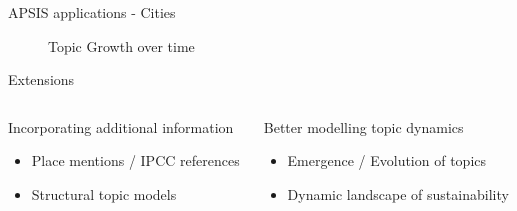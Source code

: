 \documentclass[9pt]{beamer}
\begin{document}
\begin{frame}{APSIS applications - Cities}


\begin{figure}
	\caption{Topic Growth over time \citep{Lamb2017} }
\end{figure}


\end{frame}

\begin{frame}{Extensions}

\begin{columns}
	\begin{column}{0.5\linewidth}
		\begin{tcolorbox}[colback=green!5,colframe=green!40!black]
			Incorporating additional information
		\end{tcolorbox}
		\begin{itemize}
			\item Place mentions / IPCC references
			\item Structural topic models \citep{Roberts2014a}
		\end{itemize}	
	\end{column}
	
	\begin{column}{0.5\linewidth}	
		\begin{tcolorbox}[colback=green!5,colframe=green!40!black]
			Better modelling topic dynamics
		\end{tcolorbox}
		\begin{itemize}
			\item Emergence / Evolution of topics
			\item Dynamic landscape of sustainability \citep{Minx2017} 
		\end{itemize}
		
	\end{column}
\end{columns}

\end{frame}
\end{document}
